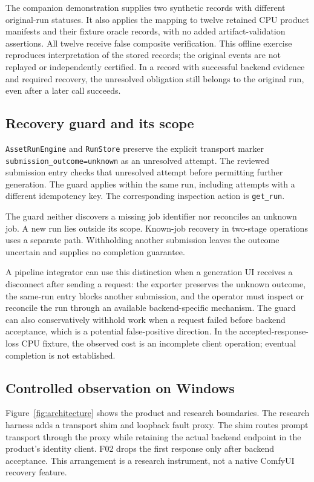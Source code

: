 \documentclass{ieeeaccess}
\begin{document}
The companion demonstration supplies two synthetic records with different
original-run statuses. It also applies the mapping to twelve retained CPU
product manifests and their fixture oracle records, with no added
artifact-validation assertions. All twelve receive false composite verification.
This offline exercise reproduces interpretation of the stored records;
the original events are not replayed or independently certified. In a record
with successful backend evidence and required recovery, the unresolved
obligation still belongs to the original run, even after a later call succeeds.

\subsection{Recovery guard and its scope}

\texttt{AssetRunEngine} and \texttt{RunStore} preserve the explicit transport marker
\texttt{submission\_outcome=unknown} as an unresolved attempt. The reviewed submission
entry checks that unresolved attempt before permitting further generation.
The guard applies within the same run, including attempts with a different
idempotency key. The corresponding inspection action is \texttt{get\_run}.

The guard neither discovers a missing job identifier nor reconciles an unknown
job. A new run lies outside its scope. Known-job recovery in two-stage operations
uses a separate path. Withholding another submission leaves the outcome
uncertain and supplies no completion guarantee.

A pipeline integrator can use this distinction when a generation UI receives a
disconnect after sending a request: the exporter preserves the unknown outcome,
the same-run entry blocks another submission, and the operator must inspect or
reconcile the run through an available backend-specific mechanism. The guard can
also conservatively withhold work when a request failed before backend acceptance,
which is a potential false-positive direction. In the accepted-response-loss
CPU fixture, the observed cost is an incomplete client operation; eventual
completion is not established.


\subsection{Controlled observation on Windows}

Figure~\ref{fig:architecture} shows the product and research boundaries.
The research harness adds a transport shim and loopback fault proxy. The shim
routes prompt transport through the proxy while retaining the actual backend
endpoint in the product's identity client. F02 drops the first response only
after backend acceptance. This arrangement is a research instrument, not a
native ComfyUI recovery feature.
\end{document}
